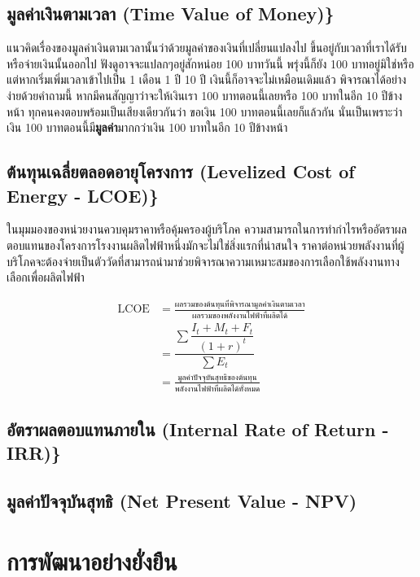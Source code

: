 \documentclass[11pt]{article}
\begin{document}
\subsection{มูลค่าเงินตามเวลา (Time Value of Money)\}}
\label{sec:org04636dc}

แนวคิดเรื่องของมูลค่าเงินตามเวลานั้นว่าด้วยมูลค่าของเงินที่เปลี่ยนแปลงไป ขึ้นอยู่กับเวลาที่เราได้รับหรือจ่ายเงินนั้นออกไป ฟังดูอาจจะแปลกๆอยู่สักหน่อย 100 บาทวันนี้ พรุ่งนี้ก็ยัง 100 บาทอยู่มิใช่หรือ แต่หากเริ่มเพิ่มเวลาเข้าไปเป็น 1 เดือน 1 ปี 10 ปี เงินนี้ก็อาจจะไม่เหมือนเดิมแล้ว พิจารณาได้อย่างง่ายด้วยคำถามนี้ หากมีคนสัญญาว่าจะให้เงินเรา 100 บาทตอนนี้เลยหรือ 100 บาทในอีก 10 ปีข้างหน้า ทุกคนคงตอบพร้อมเป็นเสียงเดียวกันว่า ขอเงิน 100 บาทตอนนี้เลยก็แล้วกัน นั่นเป็นเพราะว่าเงิน 100 บาทตอนนี้มี\textbf{มูลค่า}มากกว่าเงิน 100 บาทในอีก 10 ปีข้างหน้า

\subsection{ต้นทุนเฉลี่ยตลอดอายุโครงการ (Levelized Cost of Energy - LCOE)\}}
\label{sec:orgba134d4}

ในมุมมองของหน่วยงานควบคุมราคาหรือคุ้มครองผู้บริโภค ความสามารถในการทำกำไรหรืออัตราผลตอบแทนของโครงการโรงงานผลิตไฟฟ้าหนึ่งมักจะไม่ใช่สิ่งแรกที่น่าสนใจ ราคาต่อหน่วยพลังงานที่ผู้บริโภคจะต้องจ่ายเป็นตัววัดที่สามารถนำมาช่วยพิจารณาความเหมาะสมของการเลือกใช้พลังงานทางเลือกเพื่อผลิตไฟฟ้า

\begin{align}
  \label{eq:LCOE}
  \text{LCOE} &= \frac{\text{ผลรวมของต้นทุนที่พิจารณามูลค่าเงินตามเวลา}}{\text{ผลรวมของพลังงานไฟฟ้าที่ผลิตได้}} \\[10pt]
              &= \dfrac{\sum \dfrac{I_t + M_t + F_t}{(1+r)^t}}{\sum E_t} \\[10pt]
              &= \frac{\text{มูลค่าปัจจุบันสุทธิของต้นทุน}}{\text{พลังงานไฟฟ้าที่ผลิตได้ทั้งหมด}}
\end{align}

\subsection{อัตราผลตอบแทนภายใน (Internal Rate of Return - IRR)\}}
\label{sec:orgc05e71c}

\subsection{มูลค่าปัจจุบันสุทธิ (Net Present Value - NPV)}
\label{sec:org7c5ce8b}

\section{การพัฒนาอย่างยั่งยืน}
\label{sec:org41675d1}
\end{document}
